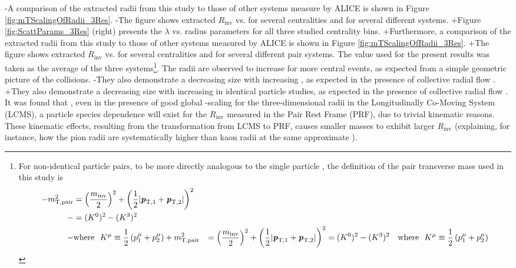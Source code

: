 -A comparison of the extracted radii from this study to those of other systems measure by ALICE \cite{Adam:2015vja} is shown in Figure \ref{fig:mTScalingOfRadii_3Res}. 
-The figure shows extracted $R_{\mathrm{inv}}$ vs. \mt for several centralities and for several different systems.
+Figure \ref{fig:ScattParams_3Res} (right) presents the $\lambda$ vs. radius parameters for all three studied centrality bins. 
+Furthermore, a comparison of the extracted radii from this study to those of other systems measured by ALICE \cite{Adam:2015vja} is shown in Figure \ref{fig:mTScalingOfRadii_3Res}. 
+The figure shows extracted $R_{\mathrm{inv}}$ vs. \mt for several centralities and for several different pair systems.
 The \mt value used for the present \LamK results was taken as the average of the three systems\footnote[1]
 {
 For non-identical particle pairs, to be more directly analogous to the single particle \mt, the definition of the pair transverse mass used in this study is
 \begin{equation*}
 \begin{aligned}
- m_{\mathrm{T, pair}}^{2} &= \left( \frac{m_{\mathrm{inv}}}{2} \right)^{2} + \left( \frac{1}{2} |\textbf{\textit{p}}_{\mathrm{T,1}} + \textbf{\textit{p}}_{\mathrm{T,2}}| \right)^{2} \\
- &= (K^{0})^{2} - (K^{3})^{2} \\
- &\mathrm{where} ~~K^{\mu} \equiv \frac{1}{2} \left( p_{1}^{\mu} + p_{2}^{\mu} \right)
+ m_{\mathrm{T, pair}}^{2} &= \left( \frac{m_{\mathrm{inv}}}{2} \right)^{2} + \left( \frac{1}{2} |\textbf{\textit{p}}_{\mathrm{T,1}} + \textbf{\textit{p}}_{\mathrm{T,2}}| \right)^{2} = (K^{0})^{2} - (K^{3})^{2} \quad \mathrm{where} ~~K^{\mu} \equiv \frac{1}{2} \left( p_{1}^{\mu} + p_{2}^{\mu} \right)
 \end{aligned}
 \label{eqn:PairmTv1}
 \end{equation*}
 }.
 The radii are observed to increase for more central events, as expected from a simple geometric picture of the collisions.
-They also demonstrate a decreasing size with increasing \mt, as expected in the presence of collective radial flow \cite{Akkelin:1995gh}.
+They also demonstrate a decreasing size with increasing \mt in identical particle studies, as expected in the presence of collective radial flow \cite{Akkelin:1995gh}.
 It was found that \cite{Kisiel:2014upa}, even in the presence of good global \mt-scaling for the three-dimensional radii in the Longitudinally Co-Moving System (LCMS), a particle species dependence will exist for the $R_{\mathrm{inv}}$ measured in the Pair Rest Frame (PRF), due to trivial kinematic reasons.
 These kinematic effects, resulting from the transformation from LCMS to PRF, causes smaller masses to exhibit larger $R_{\mathrm{inv}}$ \cite{Adam:2015vja} (explaining, for instance, how the pion radii are systematically higher than kaon radii at the same approximate \mt).
 
